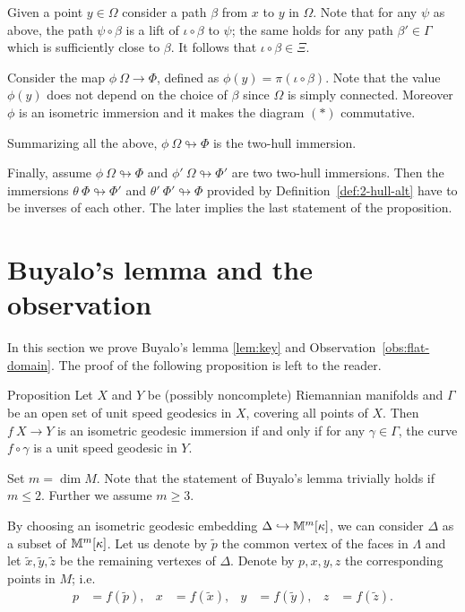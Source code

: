 \documentclass[oneside,a4paper]{article}
\begin{document}
Given a point $y\in \Omega$ consider a path $\beta$ from $x$ to $y$ in $\Omega$.
Note that for any $\psi$ as above,
the path $\psi\circ\beta$ is a lift of $\iota\circ\beta$ to $\psi$;
the same holds for any path $\beta'\in\Gamma$ 
which is sufficiently close to $\beta$.
It follows that $\iota\circ\beta\in\Xi$.

Consider the map $\phi\:\Omega\to \Phi$, defined as $\phi(y)= \pi(\iota\circ\beta)$.
Note that the value $\phi(y)$ does not depend on the choice of $\beta$ since $\Omega$ is simply connected.
Moreover $\phi$ is an isometric immersion and
it makes the diagram $({*})$ commutative.

Summarizing all the above, $\phi\:\Omega\looparrowright\Phi$ is the two-hull immersion.

Finally, assume $\phi\:\Omega\looparrowright\Phi$ and $\phi'\:\Omega\looparrowright\Phi'$
are two two-hull immersions.
Then the immersions  $\theta\:\Phi\looparrowright\Phi'$ and $\theta'\:\Phi'\looparrowright\Phi$
provided by Definition~\ref{def:2-hull-alt} 
have to be inverses of each other.
The later implies the last statement of the proposition.
\qeds


\section{Buyalo's lemma and the observation}\label{sec:key-lenmma}

In this section we prove Buyalo's lemma \ref{lem:key}
and Observation~\ref{obs:flat-domain}.
The proof of the following proposition is left to the reader.

\begin{thm}{Proposition}\label{lem:triv}
Let $X$ and $Y$ be (possibly noncomplete) Riemannian manifolds
and $\Gamma$ be an open set of unit speed geodesics in $X$,
covering all points of $X$.
Then $f\:X\to Y$ is an isometric geodesic immersion
if and only if for any $\gamma\in\Gamma$,
the curve $f\circ\gamma$ is a unit speed geodesic in $Y$.
\end{thm}


Set $m=\dim M$.
Note that the statement of Buyalo's lemma trivially holds if $m\le 2$.
Further we assume $m\ge 3$.

By choosing an isometric geodesic embedding $\Delta\hookrightarrow\mathbb{M}^m[\kappa]$,
we can consider $\Delta$ as a subset of $\mathbb{M}^m[\kappa]$.
Let us denote by $\tilde p$ the common vertex of the faces in $\Lambda$ and
let $\tilde x,\tilde y,\tilde z$ be the remaining vertexes of $\Delta$.
Denote by $p,x,y,z$ the corresponding points in $M$;
i.e.
\begin{align*}
p&=f(\tilde p),
&
x&=f(\tilde x),
&
y&=f(\tilde y),
&
z&=f(\tilde z).
\end{align*}
\end{document}
